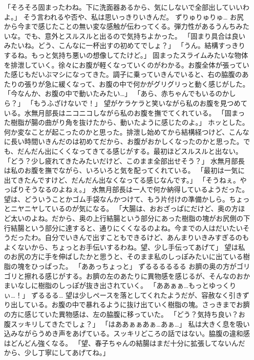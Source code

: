 「そろそろ固まったわね。下に洗面器あるから、気にしないで全部出していいわよ。」
そう言われるや否や、私は思いっきりいきんだ。
ずりゅりゅりゅ…
お尻から今まで感じたことの無い変な感触が伝わってくる。弾力性があるうんちみたいな。でも、意外とスルスルと出るので気持ちよかった。
「固まり具合は良いみたいね。どう、こんなに一杯出すの初めてでしょ？」
「うん。結構すっきりするね。もっと気持ち悪いの想像してたけど。」
固まったスライムみたいな物体を排泄していく。徐々にお腹が軽くなっていくのがわかる。お腹全体が張っていた感じもだいぶマシになってきた。調子に乗っていきんでいると、右の脇腹のあたりの張りが急に緩くなって、お腹の中で何かがグリグリっと動く感じがした。
「今なんか、お腹の中で動いたみたい…」
「あら、赤ちゃんでもいるのかしら？」
「もうふざけないで！」
望がケラケラと笑いながら私のお腹を見つめている。水無月部長はニコニコしながら私のお腹を撫でてくれている。
「固まった樹脂が腸の曲がり角を抜けたから、動いたように感じたのよ。」
ホッとした。何か変なことが起こったのかと思った。排泄し始めてから結構経つけど、こんなに長い時間いきんだのは初めてだから、お腹がおかしくなったのかと思った。でも、だんだん出にくくなってきてる感じがする。最初ほどスルスルと出ない。
「どう？少し疲れてきたみたいだけど、このまま全部出せそう？」
水無月部長は私のお腹を撫でながら、いろいろと気を配ってくれている。
「最初は一気に出てきたんですけど、だんだん出なくなってる感じなんです。」
「そうねぇ。やっぱりそうなるのよねぇ。」
水無月部長は一人で何か納得しているようだった。望は、どういうことかゴム手袋なんかつけて、もう片付けの準備かしら。ちょっとニヤニヤしているのが気になる。
「大腸は、おおざっぱにだけど、奥の方ほど太いのよね。だから、奥の上行結腸という部分にあった樹脂の塊がお尻側の下行結腸という部分に達すると、通りにくくなるのよね。今までの人はだいたいそうだったわ。自分でいきんで出すこともできるけど、あんまりいきみすぎるのもよくないから、ちょっとお手伝いするわね。望、少し手伝ってあげて」
望は私のお尻の方に手を伸ばしたかと思うと、そのまま私のしっぽみたいに出ている樹脂の塊をひっぱった。
「ああっちょっと」
ずるるるるるる
お臍の奥の方がゴリゴリと擦れる感じがする。お臍の左のあたりに異物感を感じるが、そんなのおかまいなしに樹脂のしっぽが抜き出されていく。
「ああぁぁ…もっとゆっくりぃ…！」
ずるるる…
望は少しペースを落としてくれたようだが、容赦なく引きずり出している。お腹の中で暴れるように抜け出ていく樹脂の塊。さっきまでお臍の方に感じていた異物感は、左の脇腹に移っていた。
「どう？気持ち良い？お腹スッキリしてきたでしょ？」
「はああぁぁあぁ…あぁ…」
私は大きく息を吸い込みながらうめき声をあげている。スッキリどころの話ではない。脇腹の違和感はどんどん強くなる。
「望、春子ちゃんの結腸はまだ十分に拡張してないんだから、少し丁寧にしてあげてね。」
